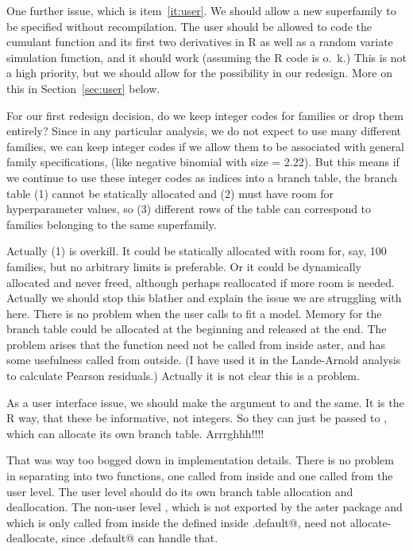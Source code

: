 \documentclass[11pt]{article}
\begin{document}
One further issue, which is item~\ref{it:user}.  We should allow
a new superfamily to be specified without recompilation.  The user should
be allowed to code the cumulant function and its first two derivatives
in R as well as a random variate simulation function, and it should work
(assuming the R code is o.~k.)  This is not a high priority, but we should
allow for the possibility in our redesign.
More on this in Section~\ref{sec:user} below.

For our first redesign decision, do we keep integer codes for families
or drop them entirely?  Since in any particular analysis, we do not
expect to use many different families, we can keep integer codes if we
allow them to be associated with general family specifications, (like
negative binomial with size = 2.22).
But this means if we continue to use these
integer codes as indices into a branch table, the branch table (1) cannot
be statically allocated and (2) must have room for hyperparameter values,
so (3) different rows of the table can correspond to families belonging to
the same superfamily.

Actually (1) is overkill.  It could be statically allocated with room
for, say, 100 families, but no arbitrary limits is preferable.
Or it could be dynamically allocated and never freed, although perhaps
reallocated if more room is needed.  Actually we should stop this blather
and explain the issue we are struggling with here.   There is no problem
when the user calls \verb@aster@ to fit a model.  Memory for the branch
table could be allocated at the beginning and released at the end.
The problem arises that the \verb@mlogl@ function need not be called from
inside aster, and has some usefulness called from outside.  (I have used
it in the Lande-Arnold analysis to calculate Pearson residuals.)
Actually it is not clear this is a problem.

As a user interface issue, we should make the \verb@fam@ argument to
\verb@aster@ and \verb@mlogl@ the same.  It is the R way, that these be
informative, not integers.  So they can just be passed to \verb@mlogl@,
which can allocate its own branch table.  Arrrghhh!!!!

That was way too bogged down in implementation details.  There is no
problem in separating \verb@mlogl@ into two functions, one called from
inside \verb@aster@ and one called from the user level.  The user level
\verb@mlogl@ should do its own branch table allocation and deallocation.
The non-user level \verb@mloglhelper@, which is not exported by the aster
package and which is only called from inside the \verb@objfun@ defined
inside \verb@aster.default@, need not allocate-deallocate, since
\verb@aster.default@ can handle that.
\end{document}
